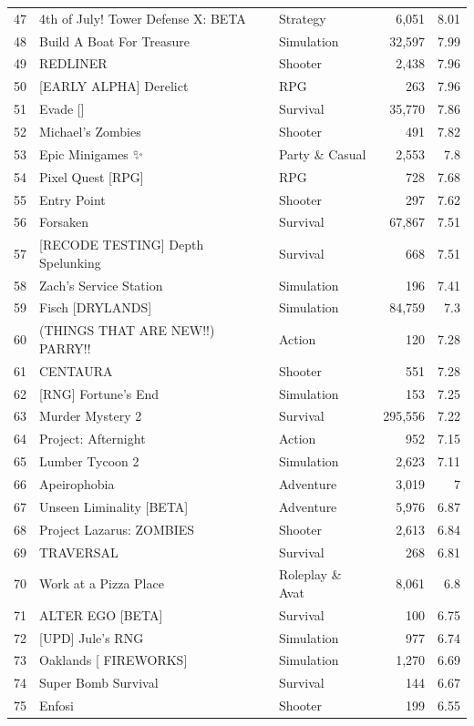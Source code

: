 \documentclass[10pt]{article}
\begin{document}
\begin{longtable}{r l l r r}
47 & 4th of July! Tower Defense X: BETA & Strategy & 6,051 & 8.01 \\
48 & Build A Boat For Treasure & Simulation & 32,597 & 7.99 \\
49 & REDLINER & Shooter & 2,438 & 7.96 \\
50 & [EARLY ALPHA] Derelict & RPG & 263 & 7.96 \\
51 & Evade [] & Survival & 35,770 & 7.86 \\
52 & Michael's Zombies & Shooter & 491 & 7.82 \\
53 & Epic Minigames ✨ & Party \& Casual & 2,553 & 7.8 \\
54 & Pixel Quest [RPG] & RPG & 728 & 7.68 \\
55 & Entry Point & Shooter & 297 & 7.62 \\
56 & Forsaken & Survival & 67,867 & 7.51 \\
57 & [RECODE TESTING] Depth Spelunking & Survival & 668 & 7.51 \\
58 & Zach's Service Station & Simulation & 196 & 7.41 \\
59 & Fisch  [DRYLANDS] & Simulation & 84,759 & 7.3 \\
60 & (THINGS THAT ARE NEW!!) PARRY!! & Action & 120 & 7.28 \\
61 & CENTAURA & Shooter & 551 & 7.28 \\
62 & [RNG] Fortune's End & Simulation & 153 & 7.25 \\
63 & Murder Mystery 2 & Survival & 295,556 & 7.22 \\
64 & Project: Afternight & Action & 952 & 7.15 \\
65 & Lumber Tycoon 2 & Simulation & 2,623 & 7.11 \\
66 & Apeirophobia & Adventure & 3,019 & 7 \\
67 & Unseen Liminality [BETA] & Adventure & 5,976 & 6.87 \\
68 & Project Lazarus:  ZOMBIES & Shooter & 2,613 & 6.84 \\
69 & TRAVERSAL & Survival & 268 & 6.81 \\
70 & Work at a Pizza Place & Roleplay \& Avat & 8,061 & 6.8 \\
71 & ALTER EGO [BETA] & Survival & 100 & 6.75 \\
72 & [UPD] Jule's RNG & Simulation & 977 & 6.74 \\
73 & Oaklands [ FIREWORKS] & Simulation & 1,270 & 6.69 \\
74 & Super Bomb Survival & Survival & 144 & 6.67 \\
75 & Enfosi & Shooter & 199 & 6.55 \\

\end{longtable}
\end{document}
